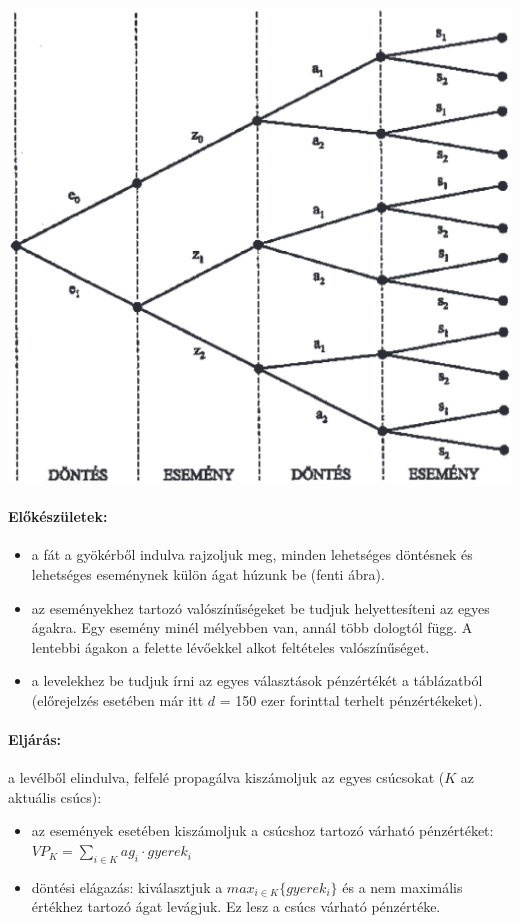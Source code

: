 \documentclass[a4paper,12pt]{article}
\begin{document}
\begin{center}

\includegraphics[scale=0.7]{dectree01}
\\
\end{center}

\paragraph{Előkészületek: }
\begin{itemize}
\item a fát a gyökérből indulva rajzoljuk meg, minden lehetséges döntésnek és lehetséges eseménynek külön ágat húzunk be (fenti ábra).
\item az eseményekhez tartozó valószínűségeket be tudjuk helyettesíteni az egyes ágakra. Egy esemény minél mélyebben van, annál több dologtól függ. A lentebbi ágakon a felette lévőekkel alkot feltételes valószínűséget.
\item a levelekhez be tudjuk írni az egyes választások pénzértékét a táblázatból (előrejelzés esetében már itt $d$ = 150 ezer forinttal terhelt pénzértékeket).
\end{itemize}

\paragraph{Eljárás: }
a levélből elindulva, felfelé propagálva kiszámoljuk az egyes csúcsokat ($K$ az aktuális csúcs):
\begin{itemize}
\item az események esetében kiszámoljuk a csúcshoz tartozó várható pénzértéket: \\
 $VP_K = \sum_{i\in K} ag_i\cdot gyerek_i$ 
\item döntési elágazás: kiválasztjuk a $max_{i\in K}\{gyerek_i\}$ és a nem maximális értékhez tartozó ágat levágjuk. Ez lesz a csúcs várható pénzértéke.
\end{itemize}
\end{document}
